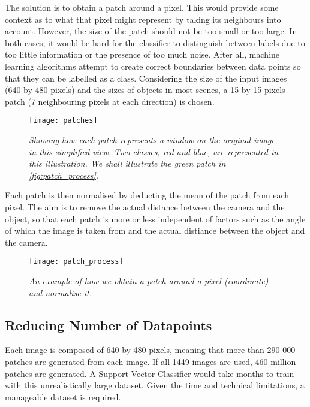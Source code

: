 The solution is to obtain a patch around a pixel. This would provide some context as to what that pixel might represent by taking its neighbours into account. However, the size of the patch should not be too small or too large. In both cases, it would be hard for the classifier to distinguish between labels due to too little information or the presence of too much noise. After all, machine learning algorithms attempt to create correct boundaries between data points so that they can be labelled as a class. Considering the size of the input images (640-by-480 pixels) and the sizes of objects in most scenes, a 15-by-15 pixels patch (7 neighbouring pixels at each direction) is chosen.

\begin{figure}[h]
  \centering
  \texttt{[image: patches]}
  \caption{\textit{Showing how each patch represents a window on the original image in this simplified view. Two classes, red and blue, are represented in this illustration. We shall illustrate the green patch in \protect\autoref{fig:patch_process}.}}
  \label{fig:patches}
\end{figure}

Each patch is then normalised by deducting the mean of the patch from each pixel. The aim is to remove the actual distance between the camera and the object, so that each patch is more or less independent of factors such as the angle of which the image is taken from and the actual distiance between the object and the camera. 

\begin{figure}[h]
  \centering
  \texttt{[image: patch\_process]}
  \caption{\textit{An example of how we obtain a patch around a pixel (coordinate) and normalise it.}}
  \label{fig:patch_process}
\end{figure}

\subsection{Reducing Number of Datapoints} \label{ssec:datapoint-reduction}
Each image is composed of 640-by-480 pixels, meaning that more than 290 000 patches are generated from each image. If all 1449 images are used, 460 million patches are generated. A Support Vector Classifier would take months to train with this unrealistically large dataset. Given the time and technical limitations, a manageable dataset is required. 

